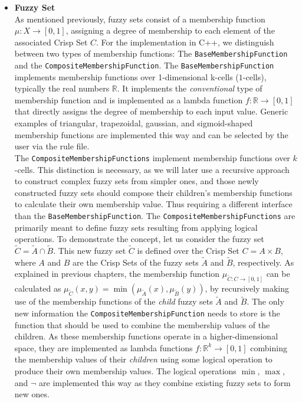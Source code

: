 \begin{itemize}
  \item \textbf{Fuzzy Set} \\
        As mentioned previously, fuzzy sets consist of a membership function $\mu: X \rightarrow [0, 1]$, assigning a degree of membership to each element of the associated Crisp Set $C$. For the implementation in C++, we distinguish between two types of membership functions: The \texttt{BaseMembershipFunction} and the \texttt{CompositeMembershipFunction}. The \texttt{BaseMembershipFunction} implements membership functions over 1-dimensional k-cells ($1$-cells), typically the real numbers $\mathbb{R}$. It implements the \emph{conventional} type of membership function and is implemented as a lambda function $f: \mathbb{R} \rightarrow [0, 1]$ that directly assigns the degree of membership to each input value. Generic examples of triangular, trapezoidal, gaussian, and sigmoid-shaped membership functions are implemented this way and can be selected by the user via the rule file. \\
        \smallskip
        The \texttt{CompositeMembershipFunctions} implement membership functions over  $k$-cells. This distinction is necessary, as we will later use a recursive approach to construct complex fuzzy sets from simpler ones, and those newly constructed fuzzy sets should compose their children's membership functions to calculate their own membership value. Thus requiring a different interface than the \texttt{BaseMembershipFunction}. The \texttt{CompositeMembershipFunctions} are primarily meant to define fuzzy sets resulting from applying logical operations. To demonstrate the concept, let us consider the fuzzy set $\tilde{C} = \tilde{A} \cap \tilde{B}$. This new fuzzy set $\tilde{C}$ is defined over the Crisp Set $C = A \times B$, where $A$ and $B$ are the Crisp Sets of the fuzzy sets $\tilde{A}$ and $\tilde{B}$, respectively. As explained in previous chapters, the membership function $\mu_{\tilde{C} : C \rightarrow [0, 1]}$ can be calculated as $\mu_{\tilde{C}}(x, y) = \min(\mu_{\tilde{A}}(x), \mu_{\tilde{B}}(y))$, by recursively making use of the membership functions of the \emph{child} fuzzy sets $\tilde{A}$ and $\tilde{B}$. The only new information the \texttt{CompositeMembershipFunction} needs to store is the function that should be used to combine the membership values of the children. As these membership functions operate in a higher-dimensional space, they are implemented as lambda functions $f: \mathbb{R}^k \rightarrow [0, 1]$ combining the membership values of their \emph{children} using some logical operation to produce their own membership values. The logical operations $\min$, $\max$, and $\neg$ are implemented this way as they combine existing fuzzy sets to form new ones. \\

\end{itemize}
